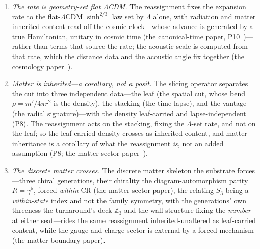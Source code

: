 \documentclass[11pt,a4paper]{article}
\theoremstyle{plain}
\theoremstyle{definition}
\theoremstyle{remark}
\begin{document}
\begin{enumerate}
locus standing at $7.65$~Gyr on the calibrated one. \emph{These are two readings of one radius and not one event}: the $\kappa=0$ degeneracy is what makes the reassignment possible, while the crossing is an event on our own worldline, and the co-location holds because the member is Nariai and for no other reason---a morphism of the description groupoid, acting on the causal reading of one
fixed geometry rather than on the geometry (the groupoid and slicing-operator papers, P5, P8~\cite{JanzenGroupoid,JanzenOperator}),
one of the vantage changes that supply the apparent multiplicity of the reachable catalogue
rather than a new solution (the range paper, P9~\cite{JanzenRange}),
and signature-preserving on the real Lorentzian substrate---a null congruence promoted to the fundamental timelike one, the manifold and its signature held fixed, so the matter rides the real Lorentzian horn while colour $\mathfrak{su}(3)$ lives across the signature seam (the matter-boundary paper~\cite{JanzenBoundary}).

\item \emph{The rate is geometry-set flat $\Lambda$CDM.} The reassignment fixes the
expansion rate to the flat-$\Lambda$CDM $\sinh^{2/3}$ law set by $\Lambda$ alone, with
radiation and matter inherited content read off the cosmic clock---whose advance is generated by
a true Hamiltonian, unitary in cosmic time (the canonical-time paper, P10~\cite{JanzenCanonicalTime})---rather than terms that source the rate; the acoustic scale is computed from that rate, which the distance data and the acoustic angle fix together (the cosmology paper~\cite{JanzenCRcosmology}).

\item \emph{Matter is inherited---a corollary, not a posit.} The slicing operator separates the
cut into three independent data---the leaf (the spatial cut, whose bend $\rho=m'/4\pi r^2$ is the
density), the stacking (the time-lapse), and the vantage (the radial signature)---with the density
leaf-carried and lapse-independent (P8). The reassignment acts on the stacking, fixing the
$\Lambda$-set rate, and not on the leaf; so the leaf-carried density crosses as inherited content,
and matter-inheritance is a corollary of what the reassignment \emph{is}, not an added assumption
(P8; the matter-sector paper~\cite{JanzenMatter}).

\item \emph{The discrete matter crosses.} The discrete matter skeleton the substrate
forces---three chiral generations, their chirality the diagram-automorphism parity $R=\gamma^5$, forced
\emph{within} CR (the matter-sector paper), the relating $S_3$ being a \emph{within-state} index and
not the family symmetry, with the generations' own threeness the
turnaround's deck $\mathbb{Z}_3$ and the wall structure fixing the \emph{number} at either
seat---rides the same reassignment inherited-unaltered as leaf-carried
content, while the gauge and charge sector is external by a forced mechanism (the matter-boundary paper).


\end{enumerate}
\end{document}
